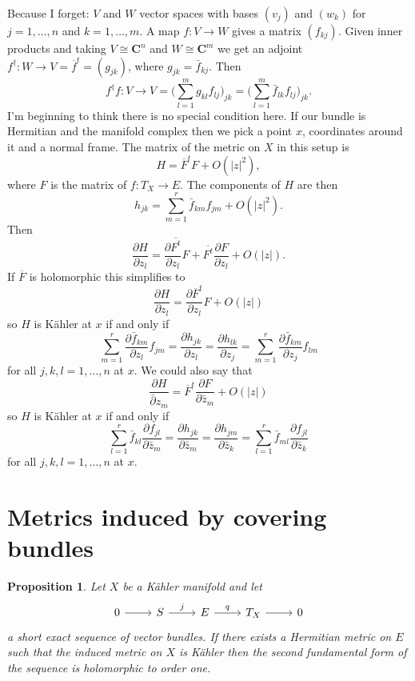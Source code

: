 \documentclass[12pt]{amsart}
\newtheorem{prop}[theo]{Proposition}
\theoremstyle{definition}
\def\ov#1{\overline{#1}}
\def\CC{\mathbf{C}}
\begin{document}
Because I forget: $V$ and $W$ vector spaces with bases $(v_j)$ and $(w_k)$ for $j=1,\ldots,n$ and $k=1,\ldots,m$.
A map $f : V \to W$ gives a matrix $(f_{kj})$.
Given inner products and taking $V \cong \CC^n$ and $W \cong \CC^m$ we get an adjoint $f^\dagger : W \to V = \ov f^t = (g_{jk})$, where $g_{jk} = \bar f_{kj}$.
Then
\[
f^\dagger f : V \to V
= \biggl(\sum_{l=1}^m g_{kl} f_{lj}\biggr)_{jk}
= \biggl(\sum_{l=1}^m \bar f_{lk} f_{lj}\biggr)_{jk}.
\]
I'm beginning to think there is no special condition here.
If our bundle is Hermitian and the manifold complex then we pick a point $x$, coordinates around it and a normal frame.
The matrix of the metric on $X$ in this setup is
\[
H = \ov F^t F + O(|z|^2),
\]
where $F$ is the matrix of $f : T_X \to E$.
The components of $H$ are then
\[
h_{jk} = \sum_{m=1}^r \bar f_{km} f_{jm} + O(|z|^2).
\]
Then
\[
\frac{\partial H}{\partial z_l}
= \frac{\partial \ov{F^t}}{\partial z_l} F
+ \ov{F^t} \frac{\partial F}{\partial z_l}
+ O(|z|).
\]
If $\ov F$ is holomorphic this simplifies to
\[
\frac{\partial H}{\partial z_l}
= \frac{\partial \ov F^t}{\partial z_l} F
+ O(|z|)
\]
so $H$ is K\"ahler at $x$ if and only if
\[
\sum_{m=1}^r \frac{\partial \bar f_{km}}{\partial z_l} f_{jm}
= \frac{\partial h_{jk}}{\partial z_l}
= \frac{\partial h_{lk}}{\partial z_j}
= \sum_{m=1}^r \frac{\partial \bar f_{km}}{\partial z_j} f_{lm}
\]
for all $j,k,l = 1, \ldots, n$ at $x$.
We could also say that
\[
\frac{\partial H}{\bar \partial z_m}
= \ov F^t \frac{\partial F}{\partial \bar z_m}
+ O(|z|)
\]
so $H$ is K\"ahler at $x$ if and only if
\[
\sum_{l=1}^r \bar f_{kl} \frac{\partial f_{jl}}{\partial \bar z_m}
= \frac{\partial h_{jk}}{\partial \bar z_m}
= \frac{\partial h_{jm}}{\partial \bar z_k}
= \sum_{l=1}^r \bar f_{ml} \frac{\partial f_{jl}}{\partial \bar z_k}
\]
for all $j,k,l = 1, \ldots, n$ at $x$.





\section{Metrics induced by covering bundles}



\begin{prop}
Let $X$ be a K\"ahler manifold and let
\[
\begin{tikzcd}
0 \ar[r] &
S \ar[r,"j"] &
E \ar[r,"q"] &
T_X \ar[r] &
0
\end{tikzcd}
\]
a short exact sequence of vector bundles.
If there exists a Hermitian metric on $E$ such that the induced metric on $X$ is K\"ahler then the second fundamental form of the sequence is holomorphic to order one.
\end{prop}
\end{document}
